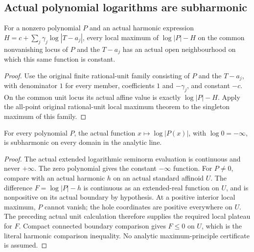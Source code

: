 \subsection{Actual polynomial logarithms are subharmonic}\label{subsec:fc-line-polynomial-subharmonic}

\begin{lemma}\label{lem:fc-polynomial-log-local-maximum}
\leanok
{}
For a nonzero polynomial $P$ and an actual harmonic expression
$H=c+\sum_j\gamma_j\log|T-a_j|$, every local maximum of
$\log|P|-H$ on the common nonvanishing locus of $P$ and the $T-a_j$
has an actual open neighbourhood on which this same function is constant.
\end{lemma}

\begin{proof}
Use the original finite rational-unit family consisting of $P$ and the
$T-a_j$, with denominator $1$ for every member, coefficients $1$ and
$-\gamma_j$, and constant $-c$. On the common unit locus its actual affine
value is exactly $\log|P|-H$. Apply the all-point original rational-unit
local maximum theorem to the singleton maximum of this family.
\end{proof}

\begin{theorem}\label{thm:fc-polynomial-log-subharmonic}
\leanok
{}
For every polynomial $P$, the actual function $x\mapsto\log|P(x)|$, with
$\log0=-\infty$, is subharmonic on every domain in the analytic line.
\end{theorem}

\begin{proof}
The actual extended logarithmic seminorm evaluation is continuous and
never $+\infty$. The zero polynomial gives the constant $-\infty$ function.
For $P\ne0$, compare with an actual harmonic $h$ on an actual standard
affinoid $U$. The difference $F=\log|P|-h$ is continuous as an extended-real
function on $U$, and is nonpositive on its actual boundary by hypothesis.
At a positive interior local maximum, $P$ cannot vanish; the hole
coordinates are positive everywhere on $U$. The preceding actual unit
calculation therefore supplies the required local plateau for $F$.
Compact connected boundary comparison gives $F\le0$ on $U$, which is the
literal harmonic comparison inequality. No analytic maximum-principle
certificate is assumed.
\end{proof}
